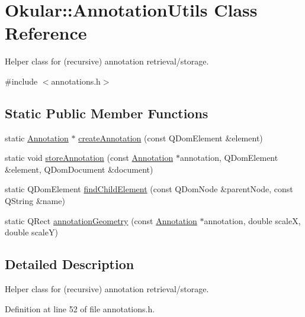 \hypertarget{classOkular_1_1AnnotationUtils}{\section{Okular\+:\+:Annotation\+Utils Class Reference}
\label{classOkular_1_1AnnotationUtils}
}


Helper class for (recursive) annotation retrieval/storage.  




{\ttfamily \#include $<$annotations.\+h$>$}

\subsection*{Static Public Member Functions}
\begin{DoxyCompactItemize}
\item 
static \hyperlink{classOkular_1_1Annotation}{Annotation} $\ast$ \hyperlink{classOkular_1_1AnnotationUtils_a790854adbb753b2a448640021442bf73}{create\+Annotation} (const Q\+Dom\+Element \&element)
\item 
static void \hyperlink{classOkular_1_1AnnotationUtils_aaf554db9b97842dd6298317dd539bf82}{store\+Annotation} (const \hyperlink{classOkular_1_1Annotation}{Annotation} $\ast$annotation, Q\+Dom\+Element \&element, Q\+Dom\+Document \&document)
\item 
static Q\+Dom\+Element \hyperlink{classOkular_1_1AnnotationUtils_a05b79294046a1756dd5fb120aa18b52b}{find\+Child\+Element} (const Q\+Dom\+Node \&parent\+Node, const Q\+String \&name)
\item 
static Q\+Rect \hyperlink{classOkular_1_1AnnotationUtils_a6b3fdb4e89227d26ec9e6f62bf4d0eb9}{annotation\+Geometry} (const \hyperlink{classOkular_1_1Annotation}{Annotation} $\ast$annotation, double scale\+X, double scale\+Y)
\end{DoxyCompactItemize}


\subsection{Detailed Description}
Helper class for (recursive) annotation retrieval/storage. 

Definition at line 52 of file annotations.\+h.



